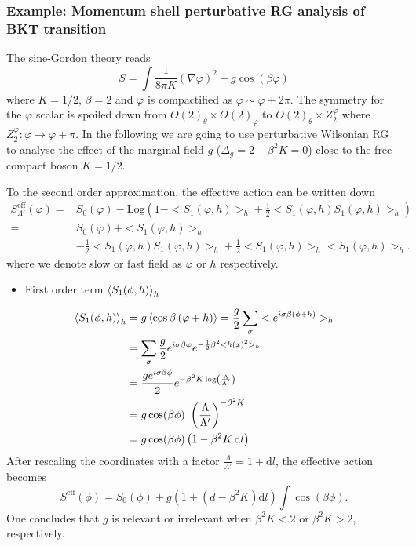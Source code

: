 \documentclass[submission, PhysLectNotes]{SciPost}
\begin{document}
\subsubsection*{Example: Momentum shell perturbative RG analysis of BKT transition}
The sine-Gordon theory reads
\begin{equation}
S = \int \frac{1}{8 \pi  K}(\nabla \varphi )^2 + g \cos( \beta \varphi)
\end{equation}
where $K=1/2$, $\beta=2$ and $\varphi$ is compactified as $\varphi \sim \varphi + 2\pi$. The symmetry for the $\varphi$ scalar is spoiled down from $O(2)_\theta \times O(2)_\varphi$ to $O(2)_\theta \times Z_2^\varphi$ where $Z_2^\varphi : \varphi \rightarrow \varphi + \pi$. In the following we are going to use perturbative Wilsonian RG to analyse the effect of the marginal field $g$ ($\Delta_g =2 - \beta^2K = 0$) close to the free compact boson $K=1/2$.

To the second order approximation, the effective action can be written down 
\begin{equation}
	\begin{aligned}
		S_{\Lambda '}^{\text{eff}} ( \varphi  ) =& S_0(\varphi ) -\text{Log} \left( 1 - <S_1(\varphi ,h)>_h + \frac{1 }{2}<S_1(\varphi ,h)S_1(\varphi ,h)>_h \right) \\
		= &S_0(\varphi) + <S_1(\varphi ,h)>_h \\
		&- \frac{1}{2}<S_1(\varphi ,h)S_1(\varphi ,h)>_h + \frac{1}{2}<S_1(\varphi ,h)>_h<S_1(\varphi ,h)>_h.
	\end{aligned}
\end{equation}
where we denote slow or fast field as $\varphi$ or $h$ respectively. 

\begin{itemize}
	\item First order term $\expval{S_1(\phi ,h)}_h$
\end{itemize}
\begin{equation}
	\begin{aligned}
		\expval{S_1(\phi ,h)}_h &= g \expval{\cos \beta \left(\varphi+h\right)} = \frac{g}{2}\sum _{\sigma }< e^{i \sigma  \beta  ( \phi  +h)}>_{h }\\
		& = \sum_\sigma \frac{g}{2}e^{i \sigma
		\beta  \varphi }e^{-\frac{1}{2}\beta ^2 <h(x)^2>_h } \\
 		&= \frac{g e^{i \sigma  \beta  \phi }}{2}e^{-\beta ^2 K\log 
			\left(\frac{\Lambda }{\Lambda '}\right) } \\
		&=g \cos  (\beta  \phi )\text{  }\left(\frac{\Lambda }{\Lambda '}\right)^{-\beta ^2K} \\
		&= g \cos(\beta  \phi )\left( 1 - \beta ^2K\,\mathrm{d}l \right)
	\end{aligned}
\end{equation}
After rescaling the coordinates with a factor $\frac{\Lambda}{\Lambda'}=1+\mathrm{d}l$, the effective action becomes
\begin{equation}
S^{\text{eff}}( \phi  ) = S_0(\phi ) +g \left(1 + \left(d-\beta^2K \right)\mathrm{d}l\right) \int \cos  (\beta  \phi ) .
\end{equation}
One concludes that \(g\) is relevant or irrelevant when \(\beta^2K<2\) or \(\beta ^2K>2\), respectively.
\end{document}
